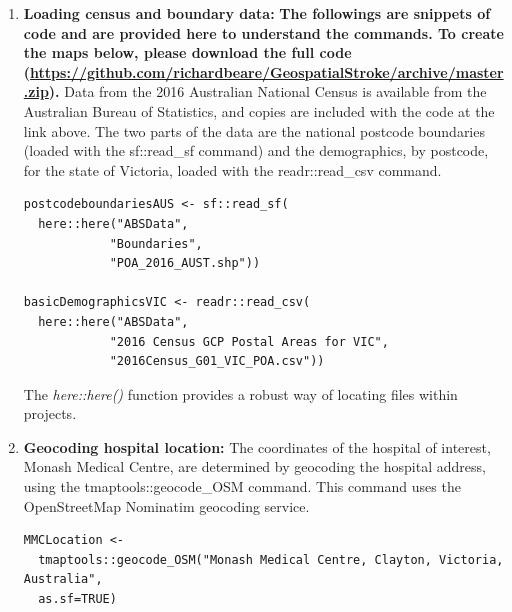 \documentclass[utf8]{frontiersHLTH}
\begin{document}
\begin{table}[h]
\begin{center}
\begin{mdframed}[backgroundcolor=blue!20]
  \sffamily
  \tiny
\begin{enumerate}
\def\labelenumi{\arabic{enumi}.}
\item
  {\bf Loading census and boundary data:} {\bf The followings are snippets of code
and are provided here to understand the commands. To create the maps
below, please download the full code (\url{https://github.com/richardbeare/GeospatialStroke/archive/master.zip}).} Data from the 2016 Australian
  National Census is available from the Australian Bureau of Statistics, and
  copies are included with the code at the link above.
  The two parts of the data are the
  national postcode boundaries (loaded with the sf::read\_sf command)
  and the demographics, by postcode, for the state of Victoria, loaded
  with the readr::read\_csv command.
\begin{lstlisting}
postcodeboundariesAUS <- sf::read_sf(
  here::here("ABSData", 
            "Boundaries", 
            "POA_2016_AUST.shp"))

basicDemographicsVIC <- readr::read_csv(
  here::here("ABSData", 
            "2016 Census GCP Postal Areas for VIC", 
            "2016Census_G01_VIC_POA.csv"))
\end{lstlisting}
The {\em here::here()} function provides a robust way of locating files within projects.
\item
  {\bf Geocoding hospital location:} The coordinates of the hospital of
  interest, Monash Medical Centre, are determined by geocoding the
  hospital address, using the tmaptools::geocode\_OSM command. This
  command uses the OpenStreetMap Nominatim geocoding service.
\begin{lstlisting}
MMCLocation <- 
  tmaptools::geocode_OSM("Monash Medical Centre, Clayton, Victoria, Australia", 
  as.sf=TRUE)


\end{lstlisting}
\end{enumerate}
\end{mdframed}
\end{center}
\end{table}
\end{document}
